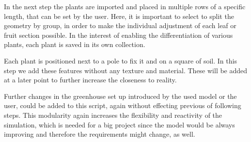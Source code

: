 In the next step the plants are imported and placed in multiple rows of a specific length, that can be set by the user. Here, it is important to select to split the geometry by group, in order to make the individual adjustment of each leaf or fruit section possible. In the interest of enabling the differentiation of various plants, each plant is saved in its own collection. 



Each plant is positioned next to a pole to fix it and on a square of soil. In this step we add these features without any texture and material. These will be added at a later point to further increase the closeness to reality. 

\vspace{5pt}

Further changes in the greenhouse set up introduced by the used model or the user, could be added to this script, again without effecting previous of following steps. This modularity again increases the flexibility and reactivity of the simulation, which is needed for a big project since the model would be always improving and therefore the requirements might change, as well. 